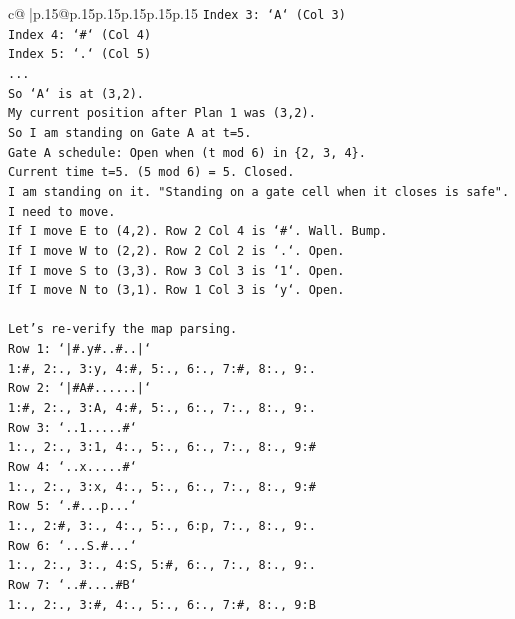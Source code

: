 \documentclass{article}
\begin{document}
{\begin{supertabular}{c@{$\;$}|p{.15\linewidth}@{}p{.15\linewidth}p{.15\linewidth}p{.15\linewidth}p{.15\linewidth}p{.15\linewidth}}
{{{\texttt{Index 3: `A` (Col 3)} \\
\texttt{Index 4: `\#` (Col 4)} \\
\texttt{Index 5: `.` (Col 5)} \\
\texttt{...} \\
\texttt{So `A` is at (3,2).} \\
\texttt{My current position after Plan 1 was (3,2).} \\
\texttt{So I am standing on Gate A at t=5.} \\
\texttt{Gate A schedule: Open when (t mod 6) in \{2, 3, 4\}.} \\
\texttt{Current time t=5. (5 mod 6) = 5. Closed.} \\
\texttt{I am standing on it. "Standing on a gate cell when it closes is safe".} \\
\texttt{I need to move.} \\
\texttt{If I move E to (4,2). Row 2 Col 4 is `\#`. Wall. Bump.} \\
\texttt{If I move W to (2,2). Row 2 Col 2 is `.`. Open.} \\
\texttt{If I move S to (3,3). Row 3 Col 3 is `1`. Open.} \\
\texttt{If I move N to (3,1). Row 1 Col 3 is `y`. Open.} \\
\\ 
\texttt{Let's re{-}verify the map parsing.} \\
\texttt{Row 1: `|\#.y\#..\#..|`} \\
\texttt{1:\#, 2:., 3:y, 4:\#, 5:., 6:., 7:\#, 8:., 9:.} \\
\texttt{Row 2: `|\#A\#......|`} \\
\texttt{1:\#, 2:., 3:A, 4:\#, 5:., 6:., 7:., 8:., 9:.} \\
\texttt{Row 3: `..1.....\#`} \\
\texttt{1:., 2:., 3:1, 4:., 5:., 6:., 7:., 8:., 9:\#} \\
\texttt{Row 4: `..x.....\#`} \\
\texttt{1:., 2:., 3:x, 4:., 5:., 6:., 7:., 8:., 9:\#} \\
\texttt{Row 5: `.\#...p...`} \\
\texttt{1:., 2:\#, 3:., 4:., 5:., 6:p, 7:., 8:., 9:.} \\
\texttt{Row 6: `...S.\#...`} \\
\texttt{1:., 2:., 3:., 4:S, 5:\#, 6:., 7:., 8:., 9:.} \\
\texttt{Row 7: `..\#....\#B`} \\
\texttt{1:., 2:., 3:\#, 4:., 5:., 6:., 7:\#, 8:., 9:B} \\
}}}
\end{supertabular}}
\end{document}

